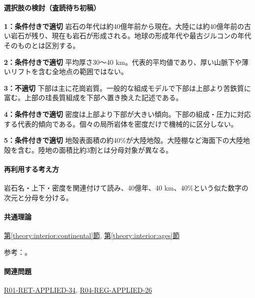 \paragraph{選択肢の検討（査読待ち初稿）}\mbox{}\par

\noindent\textbf{1：条件付きで適切} 岩石の年代は約40億年前から現在。大陸には約40億年前の古い岩石が残り、現在も岩石が形成される。地球の形成年代や最古ジルコンの年代そのものとは区別する。\par

\noindent\textbf{2：条件付きで適切} 平均厚さ30〜40 km。代表的平均値であり、厚い山脈下や薄いリフトを含む全地点の範囲ではない。\par

\noindent\textbf{3：不適切} 下部は主に花崗岩質。一般的な組成モデルで下部は上部より苦鉄質に富む。上部の珪長質組成を下部へ置き換えた記述である。\par

\noindent\textbf{4：条件付きで適切} 密度は上部より下部が大きい傾向。下部の組成・圧力に対応する代表的傾向である。個々の局所岩体を密度だけで機械的に区分しない。\par

\noindent\textbf{5：条件付きで適切} 地殻表面積の約40\%が大陸地殻。大陸棚など海面下の大陸地殻を含む。陸地の面積比約3割とは分母対象が異なる。\par

\paragraph{再利用する考え方} 岩石名・上下・密度を関連付けて読み、40億年、40 km、40\%という似た数字の次元と分母を分ける。

\paragraph{共通理論} \hyperref[theory:interior:continental]{第\ref*{theory:interior:continental}節}, \hyperref[theory:interior:ages]{第\ref*{theory:interior:ages}節}

\par 参考：\cite{umich_crust_teaching,tokyo_crust_gallery}。

\paragraph{関連問題} \hyperref[q:r01-ret-applied-34]{R01-RET-APPLIED-34}, \hyperref[q:r04-reg-applied-26]{R04-REG-APPLIED-26}

